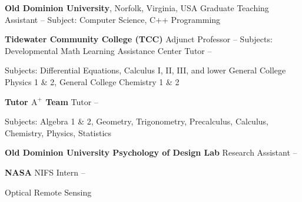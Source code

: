 \documentclass[letterpaper,10pt,oneside]{article}
\begin{document}
\begin{body}
\medskip

{\textbf{Old Dominion University}},
Norfolk, Virginia, USA
\GapNoBreak
\BulletItem
Graduate Teaching Assistant
\hfill
{} -- 
\SubBulletItem 
Subject: Computer Science, C++ Programming

\medskip

{\textbf{Tidewater Community College (TCC)}}
\GapNoBreak
\BulletItem
Adjunct Professor
\hfill
{} -- 
\SubBulletItem
Subjects: Developmental Math
\BulletItem
Learning Assistance Center Tutor
\hfill 
{} -- 
\begin{detail}
\SubBulletItem
Subjects: Differential Equations, Calculus I, II, III, and lower \newline General College Physics 1 \& 2, General College Chemistry 1 \& 2
\end{detail}

\medskip

{\textbf{Tutor \(\textrm{A}^+\) Team }}
\GapNoBreak
\BulletItem
Tutor
\hfill
{} --  
\medskip
\begin{detail}
\SubBulletItem
Subjects: Algebra 1 \& 2, Geometry, Trigonometry, Precalculus, Calculus, Chemistry, Physics, Statistics
\end{detail}

\medskip

\textbf{Old Dominion University Psychology of Design Lab} 
\GapNoBreak
\BulletItem
Research Assistant
\hfill
{} -- 
\GapNoBreak

{\textbf{NASA}}
\GapNoBreak
\BulletItem
NIFS Intern
\hfill
{} -- 
\GapNoBreak
\begin{detail}
\SubBulletItem
Optical Remote Sensing
\end{detail}

\begin{comment}
\section
{Academic Awards}
{Academic Awards}
{PDF:AcademicAwards}

\BulletItem
Deans List,
Fall 2014, Tidewater Community College 
\hfill
\DatestampY{2014}
\begin{detail}
\SubItem
For attaining a semester GPA of at least 3.2.
\end{detail}
\BulletItem
President's Honor Roll, Tidewater Community College
\hfill
\DatestampY{2015} -- \DatestampY{2016}
\begin{detail}
\SubItem
For attaining a semester GPA of at least 3.5
\end{detail}


\end{comment}
\end{body}
\end{document}
